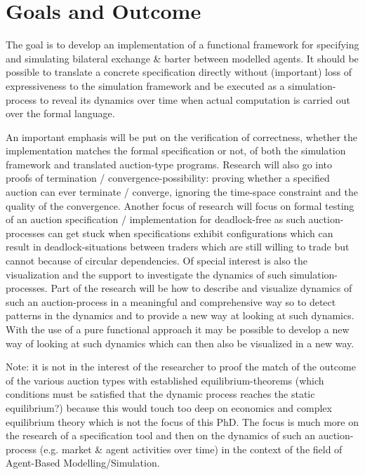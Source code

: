\documentclass{article}
\begin{document}

\section{Goals and Outcome}
The goal is to develop an implementation of a functional framework for specifying and simulating bilateral exchange \& barter between modelled agents. It should be possible to translate a concrete specification directly without (important) loss of expressiveness to the simulation framework and be executed as a simulation-process to reveal its dynamics over time when actual computation is carried out over the formal language.

\bigskip

An important emphasis will be put on the verification of correctness, whether the implementation matches the formal specification or not, of both the simulation framework and translated auction-type programs.
Research will also go into proofs of termination / convergence-possibility: proving whether a specified auction can ever terminate / converge, ignoring the time-space constraint and the quality of the convergence. Another focus of research will focus on formal testing of an auction specification / implementation for deadlock-free as such auction-processes can get stuck when specifications exhibit configurations which can result in deadlock-situations between traders which are still willing to trade but cannot because of circular dependencies.
Of special interest is also the visualization and the support to investigate the dynamics of such simulation-processes. Part of the research will be how to describe and visualize dynamics of such an auction-process in a meaningful and comprehensive way so to detect patterns in the dynamics and to provide a new way at looking at such dynamics. With the use of a pure functional approach it may be possible to develop a new way of looking at such dynamics which can then also be visualized in a new way.

\bigskip

Note: it is not in the interest of the researcher to proof the match of the outcome of the various auction types with established equilibrium-theorems (which conditions must be satisfied that the dynamic process reaches the static equilibrium?) because this would touch too deep on economics and complex equilibrium theory which is not the focus of this PhD. The focus is much more on the research of a specification tool and then on the dynamics of such an auction- process (e.g. market \& agent activities over time) in the context of the field of Agent-Based Modelling/Simulation.
\end{document}

